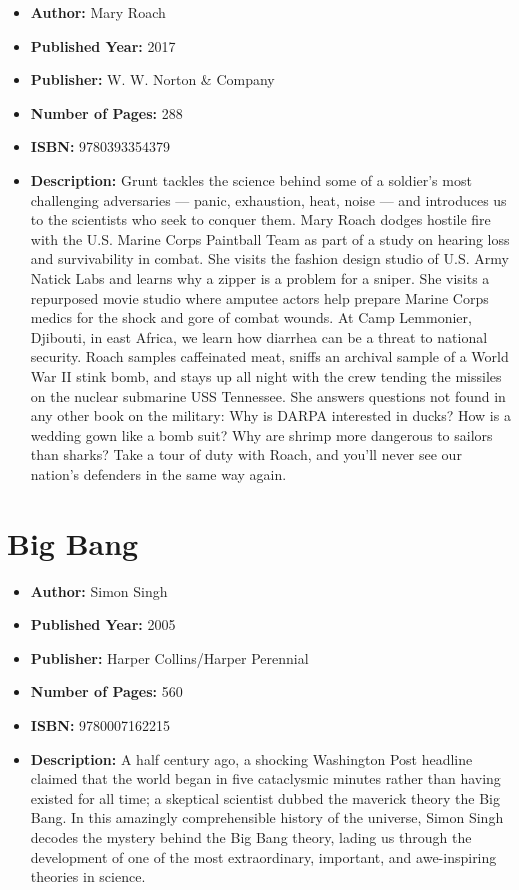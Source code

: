 \documentclass{tufte-handout}
\begin{document}
\begin{itemize}
    \item[] \textbf{Author:} Mary Roach
    \item[] \textbf{Published Year:} 2017  
    \item[] \textbf{Publisher:} W. W. Norton \& Company
    \item[] \textbf{Number of Pages:} 288      
    \item[] \textbf{ISBN:} 9780393354379
    \item[] \textbf{Description:} Grunt tackles the science behind some of a soldier's most challenging adversaries --- panic, exhaustion, heat, noise --- and introduces us to the scientists who seek to conquer them. Mary Roach dodges hostile fire with the U.S. Marine Corps Paintball Team as part of a study on hearing loss and survivability in combat. She visits the fashion design studio of U.S. Army Natick Labs and learns why a zipper is a problem for a sniper. She visits a repurposed movie studio where amputee actors help prepare Marine Corps medics for the shock and gore of combat wounds. At Camp Lemmonier, Djibouti, in east Africa, we learn how diarrhea can be a threat to national security. Roach samples caffeinated meat, sniffs an archival sample of a World War II stink bomb, and stays up all night with the crew tending the missiles on the nuclear submarine USS Tennessee. She answers questions not found in any other book on the military: Why is DARPA interested in ducks? How is a wedding gown like a bomb suit? Why are shrimp more dangerous to sailors than sharks? Take a tour of duty with Roach, and you’ll never see our nation’s defenders in the same way again.
\end{itemize}

\section*{Big Bang}

\begin{itemize}
    \item[] \textbf{Author:} Simon Singh
    \item[] \textbf{Published Year:} 2005  
    \item[] \textbf{Publisher:} Harper Collins/Harper Perennial 
    \item[] \textbf{Number of Pages:} 560      
    \item[] \textbf{ISBN:} 9780007162215
    \item[] \textbf{Description:} A half century ago, a shocking Washington Post headline claimed that the world began in five cataclysmic minutes rather than having existed for all time; a skeptical scientist dubbed the maverick theory the Big Bang. In this amazingly comprehensible history of the universe, Simon Singh decodes the mystery behind the Big Bang theory, lading us through the development of one of the most extraordinary, important, and awe-inspiring theories in science.
\end{itemize}
\end{document}

